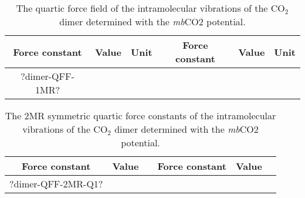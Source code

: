 \documentclass[aip,jcp,showpacs,superscriptaddress,groupedaddress]{revtex4-1}  %
\begin{document}
\begin{table}[H]
\centering
\caption{The quartic force field of the intramolecular vibrations of the CO$_2$ dimer determined with the \emph{mb}CO2 potential.}
\label{table:qff_dimer-1mr}
\begin{ruledtabular}
\begin{tabular}{cccccc}
Force constant & Value        & Unit  & Force constant & Value        & Unit     \\
\hline \Tstrut
?dimer-QFF-1MR?
\end{tabular}
\end{ruledtabular}
\end{table}


\begin{table}[H]
\centering
\caption{The 2MR symmetric quartic force constants of the intramolecular vibrations of the CO$_2$ dimer determined with the \emph{mb}CO2 potential.}
\label{table:qff_dimer-2mr-q1}
\begin{ruledtabular}
\begin{tabular}{cccccc}
Force constant & Value      &  & Force constant & Value      &    \\
\hline \Tstrut
?dimer-QFF-2MR-Q1?
\end{tabular}
\end{ruledtabular}
\end{table}
\end{document}

